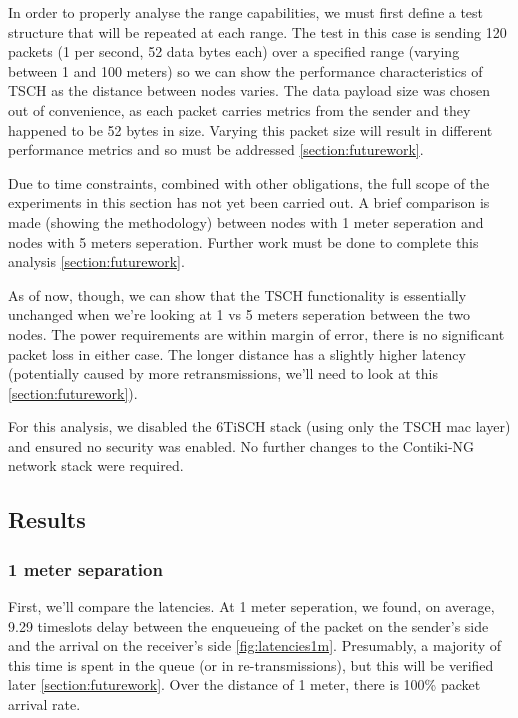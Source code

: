 \documentclass[conference]{IEEEtran}
\begin{document}
In order to properly analyse the range capabilities, we must first define a test structure that will be repeated at each range. The test in this case is sending 120 packets (1 per second, 52 data bytes each) over a specified range (varying between 1 and 100 meters) so we can show the performance characteristics of TSCH as the distance between nodes varies. The data payload size was chosen out of convenience, as each packet carries metrics from the sender and they happened to be 52 bytes in size. Varying this packet size will result in different performance metrics and so must be addressed \ref{section:futurework}. 

Due to time constraints, combined with other obligations, the full scope of the experiments in this section has not yet been carried out. A brief comparison is made (showing the methodology) between nodes with 1 meter seperation and nodes with 5 meters seperation. Further work must be done to complete this analysis \ref{section:futurework}.

As of now, though, we can show that the TSCH functionality is essentially unchanged when we're looking at 1 vs 5 meters seperation between the two nodes. The power requirements are within margin of error, there is no significant packet loss in either case. The longer distance has a slightly higher latency (potentially caused by more retransmissions, we'll need to look at this \ref{section:futurework}).

For this analysis, we disabled the 6TiSCH stack (using only the TSCH mac layer) and ensured no security was enabled. No further changes to the Contiki-NG network stack were required. 

\subsection{Results}

\subsubsection{1 meter separation}
\label{section:1metersep}
First, we'll compare the latencies. At 1 meter seperation, we found, on average, 9.29 timeslots delay between the enqueueing of the packet on the sender's side and the arrival on the receiver's side \ref{fig:latencies1m}. Presumably, a majority of this time is spent in the queue (or in re-transmissions), but this will be verified later \ref{section:futurework}.  Over the distance of 1 meter, there is 100\% packet arrival rate.
\end{document}
